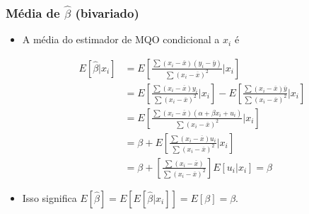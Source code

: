 \documentclass[10pt,slides,xcolor=pdftex,dvipsnames,table]{beamer}
\begin{document}
\begin{frame}[fragile]
	\frametitle{Média de $\widehat{\beta}$ (bivariado)}

\begin{itemize}\itemsep1.2em

\item A média do estimador de MQO condicional a $x_i$ é

\begin{align*}
E [\widehat{\beta} | x_i] &= E \left[ \frac{\sum (x_i - \overline{x})(y_i - \overline{y})}{\sum (x_i - \overline{x})^2} | x_i \right] \\
&= E \left[ \frac{\sum (x_i - \overline{x})y_i}{\sum (x_i - \overline{x})^2} | x_i \right] - E \left[ \frac{\sum (x_i - \overline{x}) \overline{y}}{\sum (x_i - \overline{x})^2} | x_i \right] \\
&= E \left[ \frac{\sum (x_i - \overline{x}) (\alpha + \beta x_i + u_i) }{\sum (x_i - \overline{x})^2} | x_i \right] \\
&= \beta + E \left[ \frac{\sum (x_i - \overline{x}) u_i}{\sum (x_i - \overline{x})^2} | x_i \right] \\
&= \beta + \left[ \frac{\sum (x_i - \overline{x})}{\sum (x_i - \overline{x})^2} \right] E \left[ u_i | x_i \right] = \beta
\end{align*}

\item Isso significa $E[\widehat{\beta}] = E \left[E [\widehat{\beta} | x_i] \right] = E[\beta]=\beta$. 

\end{itemize}

\end{frame}

\end{document}
